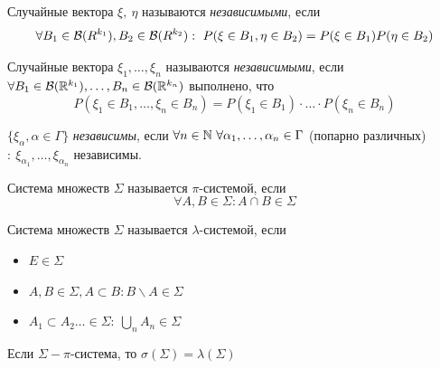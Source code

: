 \begin{definition} Случайные вектора $\xi, \ \eta$ называются \textit{независимыми}, если
\[\forall B_1 \in \mathcal{B}(R^{k_1}), B_2 \in \mathcal{B}(R^{k_2}): \ P(\xi \in B_1, \eta \in B_2) = P(\xi \in B_1)P(\eta \in B_2)\]
\end{definition}

\begin{definition} Случайные вектора $\xi_1, \ldots , \xi_n$ называются \textit{независимыми}, если  \\ $\forall  B_1 \in \mathcal{B}(\mathbb{R}^{k_1}),\ldots ,  B_n \in \mathcal{B}(\mathbb{R}^{k_n})$ выполнено, что 
\[P(\xi_1 \in B_1, \ldots ,  \xi_n \in B_n) = P(\xi_1 \in B_1) \cdot \ldots  \cdot P(\xi_n \in B_n)\]
\end{definition}

\begin{definition}  $\{\xi_{\alpha} , \alpha \in \Gamma\}$ \textit{независимы}, если $\forall n \in \N  \ \forall \alpha_1, \ldots , \alpha_n \in \Gamma$ (попарно различных) $: \ \xi_{\alpha_1}, \ldots , \xi_{\alpha_n} $ независимы.
\end{definition}

\begin{definition}
Система множеств $\Sigma$ называется $\pi$-системой, если
\[\forall A, B \in \Sigma: A\cap B \in \Sigma\]
\end{definition}

\begin{definition}
Система множеств $\Sigma $ называется $\lambda$-системой, если 
\begin{itemize}
    \item[1.] $E \in \Sigma$
    \item[2.] $ A, B \in \Sigma, A \subset B: B \backslash A \in \Sigma$
    \item[3.] $A_1 \subset A_2\ldots   \in \Sigma: \ \bigcup\limits_{n} A_n \in \Sigma$
\end{itemize}
\end{definition}

\begin{lemma}[б/д]
Если $\Sigma - \pi$-система, то $\sigma(\Sigma) = \lambda(\Sigma)$ 
\end{lemma}



